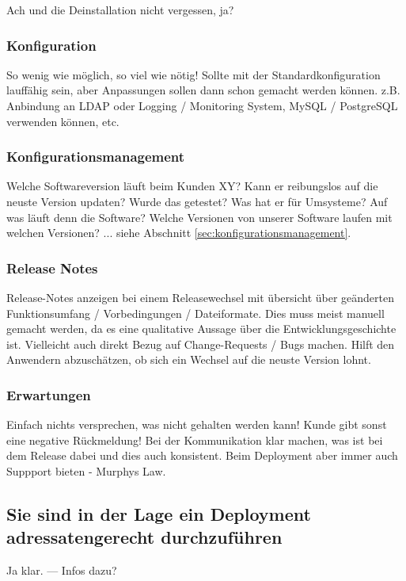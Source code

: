 Ach und die Deinstallation nicht vergessen, ja?
\subsubsection{Konfiguration}
So wenig wie möglich, so viel wie nötig! Sollte mit der Standardkonfiguration lauffähig sein, aber Anpassungen sollen dann schon gemacht werden können. z.B. Anbindung an LDAP oder Logging / Monitoring System, MySQL / PostgreSQL verwenden können, etc.

\subsubsection{Konfigurationsmanagement}
Welche Softwareversion läuft beim Kunden XY? Kann er reibungslos auf die neuste Version updaten? Wurde das getestet? Was hat er für Umsysteme? Auf was läuft denn die Software? Welche Versionen von unserer Software laufen mit welchen Versionen? ... siehe Abschnitt \ref{sec:konfigurationsmanagement}.
\subsubsection{Release Notes}
Release-Notes anzeigen bei einem Releasewechsel mit übersicht über geänderten Funktionsumfang / Vorbedingungen / Dateiformate. Dies muss meist manuell gemacht werden, da es eine qualitative Aussage über die Entwicklungsgeschichte ist. Vielleicht auch direkt Bezug auf Change-Requests / Bugs machen. Hilft den Anwendern abzuschätzen, ob sich ein Wechsel auf die neuste Version lohnt.

\subsubsection{Erwartungen}
Einfach nichts versprechen, was nicht gehalten werden kann! Kunde gibt sonst eine negative Rückmeldung! Bei der Kommunikation klar machen, was ist bei dem Release dabei und dies auch konsistent. Beim Deployment aber immer auch Suppport bieten - Murphys Law.

\subsection{Sie sind in der Lage ein Deployment adressatengerecht durchzuführen}
Ja klar.
--- Infos dazu?
